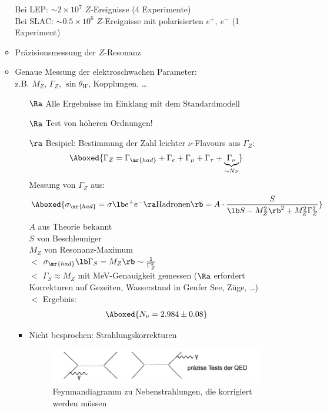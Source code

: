 \begin{itemize}
\begin{itemize}
Bei LEP: $\sim 2 \times 10^7$ $Z$-Ereignisse (4 Experimente)\\
Bei SLAC: $\sim0.5\times 10^6$ $Z$-Ereignisse mit polarisierten $e^+, \ e^-$ (1 Experiment)
\item Präzisionsmessung der $Z$-Resonanz
\item Genaue Messung der elektroschwachen Parameter:\\
z.B. $M_Z$, $\Gamma_Z$, $\sin \theta_W$, Kopplungen, \dots
\begin{itemize}
\item[$\Ra$] $\boxed{\text{Alle Ergebnisse im Einklang mit dem Standardmodell}}$
\item[$\Ra$] Test von höheren Ordnungen!
\item[$\ra$] Besipiel: Bestimmung der Zahl leichter $\nu$-Flavours aus $\Gamma_Z$:
\begin{align}
\Aboxed{\Gamma_Z = \Gamma_\mr{had} + \Gamma_e + \Gamma_\mu + \Gamma_\tau + \underbrace{\Gamma_\nu}_{\sim N \nu}}
\end{align}
Messung von $\Gamma_Z$ aus:
\begin{align}
\Aboxed{\sigma_\mr{had} = \sigma\lb e^+e^- \ra \text{Hadronen}\rb   = A \cdot \frac{S}{\lb S-M_Z^2\rb ^2 + M_Z^2 \Gamma_Z^2}}
\end{align}
$A$ aus Theorie bekannt\\
$S$ von Beschleuniger\\
$M_Z$ von Resonanz-Maximum\\
$\lt$ $\sigma_\mr{had} \lb  \Gamma_S = M_Z \rb  \sim \frac{1}{\Gamma_Z^2}$\\
$\lt$ $\Gamma_S \approx M_Z$ mit MeV-Genauigkeit gemessen ($\Ra$ erfordert Korrekturen auf Gezeiten, Wasserstand in Genfer See, Züge, \dots )\\
$\lt$ Ergebnis:
\begin{align}
\Aboxed{N_\nu = 2.984 \pm 0.08}
\end{align}
\item Nicht besprochen: Strahlungskorrekturen

\begin{figure}[!ht]
\centering
\includegraphics[width=.65\textwidth]{imgs/ep5-fig-8-20.pdf}
\caption{Feynmandiagramm zu Nebenstrahlungen, die korrigiert werden müssen \label{fig:8.20}}
\end{figure}


\end{itemize}
\end{itemize}
\end{itemize}
